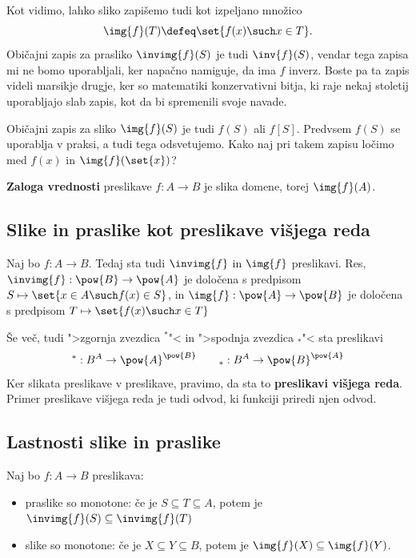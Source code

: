 Kot vidimo, lahko sliko zapišemo tudi kot izpeljano množico
%
\begin{equation*}
  \img{f}(T) \defeq \set{ f(x) \such x \in T }.
\end{equation*}
%
Običajni zapis za prasliko $\invimg{f}(S)$ je tudi $\inv{f}(S)$, vendar tega zapisa mi ne bomo uporabljali, ker napačno namiguje, da ima $f$ inverz. Boste pa ta zapis videli marsikje drugje, ker so matematiki konzervativni bitja, ki raje nekaj stoletij uporabljajo slab zapis, kot da bi spremenili svoje navade.

Običajni zapis za sliko $\img{f}(S)$ je tudi $f(S)$ ali $f[S]$. Predvsem $f(S)$ se uporablja v praksi, a tudi tega odsvetujemo. Kako naj pri takem zapisu ločimo med $f(x)$ in $\img{f}(\set{x})$?

\begin{definicija}
  \textbf{Zaloga vrednosti} preslikave $f : A \to B$ je slika domene, torej $\img{f}(A)$.
\end{definicija}


\subsection{Slike in praslike kot preslikave višjega reda}

Naj bo $f : A \to B$. Tedaj sta tudi $\invimg{f}$ in $\img{f}$ preslikavi.
%
Res, $\invimg{f} : \pow{B} \to \pow{A}$ je določena s predpisom $S \mapsto \set{ x \in A \such f(x) \in S }$, in
$\img{f} : \pow{A} \to \pow{B}$ je določena s predpisom $T \mapsto \set{ f(x) \such x \in T }$

Še več, tudi ">zgornja zvezdica $^{*}$"< in ">spodnja zvezdica $_{*}$"< sta preslikavi
%
\begin{equation*}
  {}^* : B^A \to \pow{A}^{\pow{B}} \qquad
  {}_* : B^A \to \pow{B}^{\pow{A}}
\end{equation*}
%
Ker slikata preslikave v preslikave, pravimo, da sta to \textbf{preslikavi višjega reda}. Primer preslikave višjega reda je tudi odvod, ki funkciji priredi njen odvod.


\subsection{Lastnosti slike in praslike}

\begin{izrek}
  Naj bo $f : A \to B$ preslikava:
  \begin{itemize}
  \item praslike so monotone: če je $S \subseteq T \subseteq A$, potem je $\invimg{f}(S) \subseteq \invimg{f}(T)$
  \item slike so monotone: če je $X \subseteq Y \subseteq B$, potem je $\img{f}(X) \subseteq \img{f}(Y)$.
  \end{itemize}
\end{izrek}


